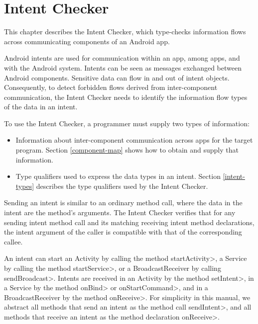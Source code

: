 \htmlhr

\newcommand{\tp}[1]{\mathit{typeof}}
\newcommand{\Fix}[1]{\textbf{[[}{\color{red} #1}\textbf{]]}}
\newcommand{\theIntentChecker}{the Intent Checker\xspace}
\newcommand{\TheIntentChecker}{The Intent Checker\xspace}
\newcommand{\sendIntent}{\<sendIntent>}
\newcommand{\onReceive}{\<onReceive>}


\chapter{Intent Checker\label{intent-checker}}

This chapter describes \theIntentChecker{},
which type-checks information flows across communicating components of an
Android app.

Android intents are used for
communication within an app, among apps, and with the Android system.
Intents can be seen as messages exchanged between Android components. Sensitive
data can flow in and out of intent objects. Consequently, to detect forbidden
flows derived from inter-component communication, \theIntentChecker{} needs to
identify the information flow types of the data in an intent.

To use \theIntentChecker{}, a programmer must supply two types of information:
\begin{itemize}
\item
Information about inter-component communication across apps for the target
program. Section \ref{component-map} shows how to obtain and supply that
information.
\item
Type qualifiers used to express the data types in an intent. Section
\ref{intent-types} describes the type qualifiers used by \theIntentChecker.
\end{itemize}

Sending an intent is similar to an ordinary method call,
where the data in the intent are the method's arguments. 
\TheIntentChecker{} verifies that for any sending intent method
call and its matching receiving intent method declarations,
the intent argument of the caller is compatible with that of the corresponding
callee. 

An intent can start an Activity by calling the method \<startActivity>, a
Service by calling the method \<startService>, or a BroadcastReceiver by
calling \<sendBroadcast>. Intents are received in an Activity by the method
\<setIntent>, in a Service by the method \<onBind> or
\<onStartCommand>, and in a BroadcastReceiver by the method
\<onReceive>. For simplicity in this manual, we abstract all methods
that send an intent as the method call \sendIntent{}, and all methods that
receive an intent as the method declaration \onReceive{}.


